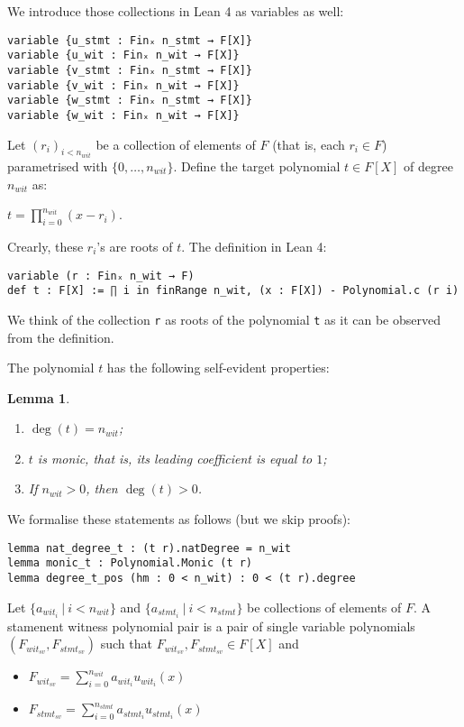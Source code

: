 \documentclass{article}
\newtheorem{lemma}{Lemma}
\theoremstyle{definition}
\theoremstyle{remark}
\begin{document}
We introduce those collections in Lean 4 as variables as well:

\begin{lstlisting}
variable {u_stmt : Finₓ n_stmt → F[X]}
variable {u_wit : Finₓ n_wit → F[X]}
variable {v_stmt : Finₓ n_stmt → F[X]}
variable {v_wit : Finₓ n_wit → F[X]}
variable {w_stmt : Finₓ n_stmt → F[X]}
variable {w_wit : Finₓ n_wit → F[X]}
\end{lstlisting}

Let $(r_i)_{i < n_{wit}}$ be a collection of elements of $F$ (that is, each $r_i \in F$) parametrised with $\{0, \dots, n_{wit} \}$.
Define the target polynomial $t \in F[X]$ of degree $n_{wit}$ as:
\begin{center}
$t = \prod \limits_{i = 0}^{n_{wit}} (x - r_i)$.
\end{center}

Crearly, these $r_i$'s are roots of $t$. The definition in Lean 4:
\begin{lstlisting}
variable (r : Finₓ n_wit → F)
def t : F[X] := ∏ i in finRange n_wit, (x : F[X]) - Polynomial.c (r i)
\end{lstlisting}

We think of the collection \verb"r" as roots of the polynomial \verb"t" as it can be observed from the definition.

The polynomial $t$ has the following self-evident properties:

\begin{lemma}
$ $

\begin{enumerate}
\item $\deg(t) = n_{wit}$;
\item $t$ is monic, that is, its leading coefficient is equal to $1$;
\item If $n_{wit} > 0$, then $\deg(t) > 0$.
\end{enumerate}
\end{lemma}

We formalise these statements as follows (but we skip proofs):
\begin{lstlisting}
lemma nat_degree_t : (t r).natDegree = n_wit
lemma monic_t : Polynomial.Monic (t r)
lemma degree_t_pos (hm : 0 < n_wit) : 0 < (t r).degree
\end{lstlisting}

Let $\{ a_{{wit}_i} \: | \: i < n_{wit}\}$ and $\{ a_{{stmt}_i} \: | \: i < n_{stmt} \}$ be collections of elements of $F$.
A stamenent witness polynomial pair is a pair of single variable polynomials $(F_{{wit}_{sv}}, F_{{stmt}_{sv}})$
such that $F_{{wit}_{sv}}, F_{{stmt}_{sv}} \in F[X]$ and
\begin{itemize}
\item $F_{{wit}_{sv}} = \sum \limits_{i = 0}^{n_{wit}} a_{{wit}_i} u_{{wit}_{i}}(x)$
\item $F_{{stmt}_{sv}} = \sum \limits_{i = 0}^{n_{stmt}} a_{{stmt}_i} u_{{stmt}_{i}}(x)$
\end{itemize}
\end{document}
